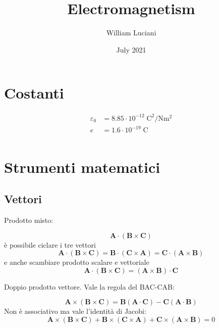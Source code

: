 \documentclass{article}
\title{ Electromagnetism }
\author{William Luciani}
\date{July 2021}
\renewcommand{\epsilon}{\varepsilon}
\newcommand{\mbf}{\mathbf}
\numberwithin{equation}{section}
\begin{document}
\maketitle

\tableofcontents

\pagebreak


\section{Costanti} %
\label{sec:costanti}

\begin{align}
    \epsilon_0  &= 8.85     \cdot 10^{-12}  \; \mathrm{ C^2 / N m^2 }\\
    e           &= 1.6      \cdot 10^{-19}  \; \mathrm{ C }\\
\end{align}


\section{Strumenti matematici} %
\label{sec:strumenti_matematici}

\subsection{Vettori} %
\label{sub:vettori}

Prodotto misto: 

\begin{equation}
    \mbf{ A \cdot ( B \times C ) }
\end{equation}
è possibile ciclare i tre vettori
\begin{equation}
    \mbf{ A \cdot ( B \times C ) } =
    \mbf{ B \cdot ( C \times A ) } =
    \mbf{ C \cdot ( A \times B ) }
\end{equation}
e anche scambiare prodotto scalare e vettoriale
\begin{equation}
    \mbf{ A \cdot ( B \times C ) } = \mbf{ ( A \times B ) \cdot C }
\end{equation}

Doppio prodotto vettore. Vale la regola del BAC-CAB:

\begin{equation}
    \mbf{ A \times ( B \times C ) } = \mbf{ B ( A \cdot C) - C ( A \cdot B) }
\end{equation}
Non è associativo ma vale l'identità di Jacobi:
\begin{equation}
    \mbf{ A \times ( B \times C ) } +
    \mbf{ B \times ( C \times A ) } +
    \mbf{ C \times ( A \times B ) } = 0
\end{equation}
\end{document}
